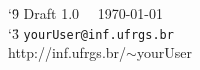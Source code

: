 %
%

\begin{center}
	\catcode`\=9
	Draft 1.0 ~~\today  \\
	\catcode`\=3
	\texttt{yourUser@inf.ufrgs.br}\\
	http://inf.ufrgs.br/$\sim$yourUser
\end{center}